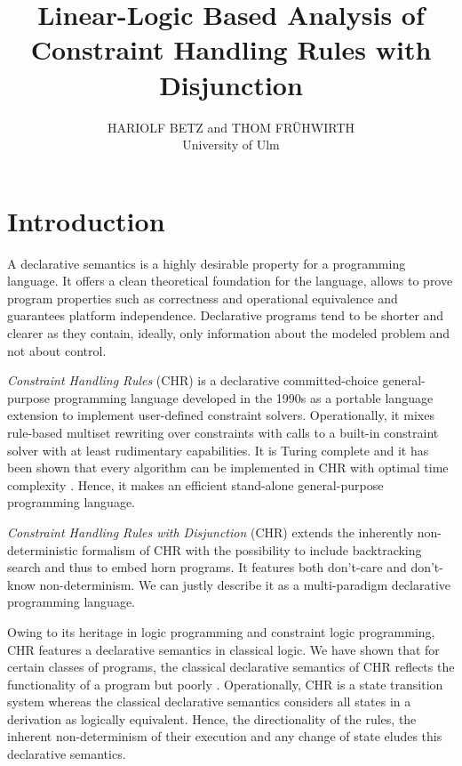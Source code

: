 \documentclass[acmtocl]{acmtrans2m}
\title{Linear-Logic Based Analysis of Constraint Handling Rules with Disjunction}
\author{HARIOLF BETZ and THOM FR\"UHWIRTH\\
University of Ulm\\
}
\begin{document}
\begin{bottomstuff}
\end{bottomstuff}

\maketitle

\section{Introduction}
A declarative semantics is a highly desirable property for a programming
language. It offers a clean theoretical foundation for the language, allows to
prove program properties such as correctness and operational equivalence and
guarantees platform independence. Declarative programs tend to be shorter and
clearer as they contain, ideally, only information about the modeled problem and
not about control.

\emph{Constraint Handling Rules} (CHR)
\cite{DBLP:journals/lncs/Fruhwirth94,DBLP:journals/jlp/Fruhwirth98,fruehwirth09}
is a declarative committed-choice general-purpose programming language developed
in the 1990s as a portable language extension to implement user-defined
constraint solvers. Operationally, it mixes rule-based multiset rewriting over
constraints with calls to a built-in constraint solver with at least rudimentary
capabilities. It is Turing complete and it has been shown that every algorithm
can be implemented in CHR with optimal time complexity
\cite{Sneyers05thecomputational}. Hence, it makes an efficient stand-alone
general-purpose programming language.

\emph{Constraint Handling Rules with Disjunction} (CHR)
\cite{DBLP:conf/fqas/AbdennadherS98} extends the inherently non-deterministic
formalism of CHR with the possibility to include backtracking search and thus to
embed horn programs. It features both don't-care and don't-know
non-determinism. We can justly describe it as a multi-paradigm declarative
programming language.

Owing to its heritage in logic programming and constraint logic programming,
CHR features a declarative semantics in classical logic. We have
shown that for certain classes of programs, the classical declarative semantics
of CHR reflects the functionality of a program but poorly
\cite{DBLP:conf/cp/BetzF05}. Operationally, CHR is a state transition system
whereas the classical declarative semantics considers all states in a derivation
as logically equivalent. Hence, the directionality of the rules, the inherent
non-determinism of their execution and any change of state eludes this
declarative semantics.
\end{document}
